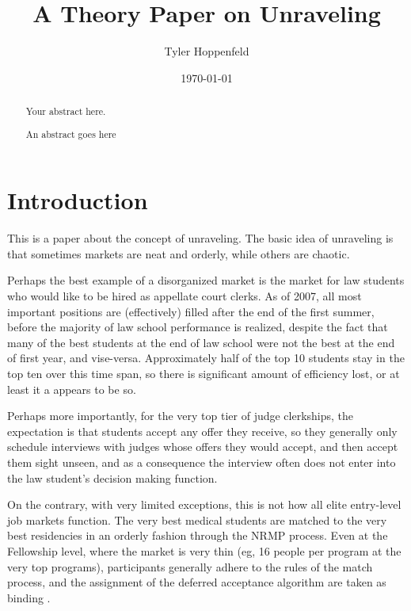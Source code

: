 \documentclass[WP]{AEA}
\begin{document}
\title{A Theory Paper on Unraveling}
\author{Tyler Hoppenfeld}
\date{\today}
\JEL{}
\Keywords{}

\begin{abstract}
Your abstract here.
\end{abstract}


\maketitle

\begin{abstract}
	An abstract goes here
\end{abstract}

\section{Introduction}


This is a paper about the concept of unraveling.  The basic idea of unraveling is that sometimes markets are neat and orderly, while others are chaotic.


Perhaps the best example of a disorganized market is the market for law students who would like to be hired as appellate court clerks.  As of 2007, all most important positions are (effectively) filled after the end of the first summer, before the majority of law school performance is realized, despite the fact that many of the best students at the end of law school were not the best at the end of first year, and vise-versa. Approximately half of the top 10 students stay in the top ten over this time span, so there is significant amount of efficiency lost, or at least it a appears to be so.

Perhaps more importantly, for the very top tier of judge clerkships, the expectation is that students accept any offer they receive, so they generally only schedule interviews with judges whose offers they would accept, and then accept them sight unseen, and as a consequence the interview often does not enter into the law student's decision making function. \cite{Avery2001}

On the contrary, with very limited exceptions, this is not how all elite entry-level job markets function.  The very best medical students are matched to the very best residencies in an orderly fashion through the NRMP process.  Even at the Fellowship level, where the market is very thin (eg, 16 people per program at the very top programs), participants generally adhere to the rules of the match process, and the assignment of the deferred acceptance algorithm are taken as binding \cite{Niederle2008,Niederle2003,Niederle2005}.
\end{document}
